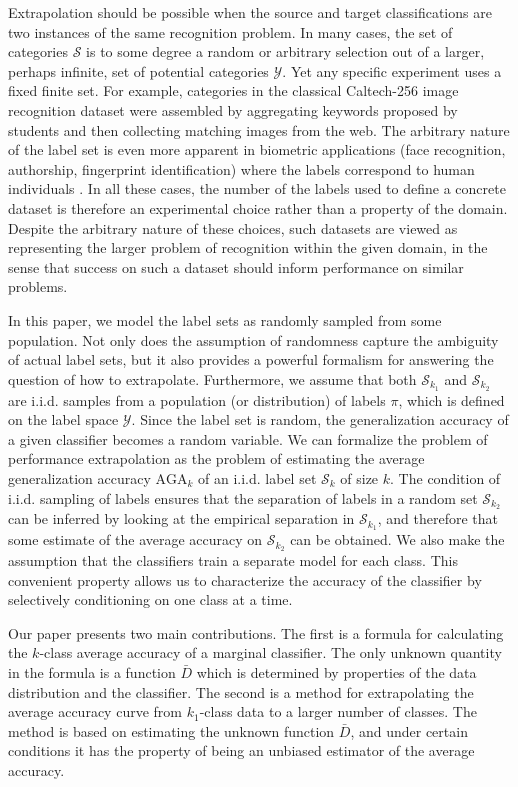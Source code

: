 \documentclass[twoside,11pt]{article}
\begin{document}
Extrapolation should be possible when the source and target classifications are two instances of the same recognition problem.
In many cases, the set of categories $\mathcal{S}$ is to some degree a random or arbitrary selection out of a larger, perhaps infinite, set of potential categories  $\mathcal{Y}$. Yet any specific experiment uses a fixed finite set.
For example, categories in the classical Caltech-256 image recognition dataset \citep{griffin2007caltech} were assembled by aggregating keywords proposed by students and then collecting matching images from the web.
The arbitrary nature of the label set is even more apparent in biometric applications (face recognition, authorship, fingerprint identification) where the labels correspond to human individuals \citep{togneri2011overview, stamatatos2014overview}. 
In all these cases, the number of the labels used to define a concrete dataset is therefore an experimental choice rather than a property of the domain.
Despite the arbitrary nature of these choices, such datasets are viewed as representing the larger problem of recognition within the given domain, in the sense that success on such a dataset should inform performance on similar problems.

In this paper, we model the label sets as randomly sampled from some population.
Not only does the assumption of randomness capture the ambiguity of actual label sets, but it also provides a powerful formalism for answering the question of how to extrapolate.
Furthermore, we assume that both $\mathcal{S}_{k_1}$ and $\mathcal{S}_{k_2}$ are i.i.d. samples
from a population (or distribution) of labels $
\pi$, which is defined on the label space $\mathcal{Y}$.
Since the label set is random, the generalization accuracy of a given classifier becomes a random variable.
We can formalize the problem of performance extrapolation as the problem of estimating the average generalization accuracy $\text{AGA}_k$ of an i.i.d. label set $\mathcal{S}_k$ of size $k$.
The condition of i.i.d. sampling of labels ensures that the
separation of labels in a random set $\mathcal{S}_{k_2}$ can be inferred by
looking at the empirical separation in $\mathcal{S}_{k_1}$, and
therefore that some estimate of the average accuracy on $\mathcal{S}_{k_2}$ can be obtained.
We also make the assumption that the classifiers
train a separate model for each class.
This convenient property allows us to
characterize the accuracy of the classifier by selectively conditioning on one class at a time.  

Our paper presents two main contributions.  The first is a formula for calculating the $k$-class average accuracy of a marginal classifier.  The only unknown quantity in the formula is a function $\bar{D}$ which is determined by properties of the data distribution and the classifier.  The second is a method for extrapolating the average accuracy curve from $k_1$-class data to a larger number of classes.  The method is based on estimating the unknown function $\bar{D}$, and under certain conditions it has the property of being an unbiased estimator of the average accuracy.
\end{document}
